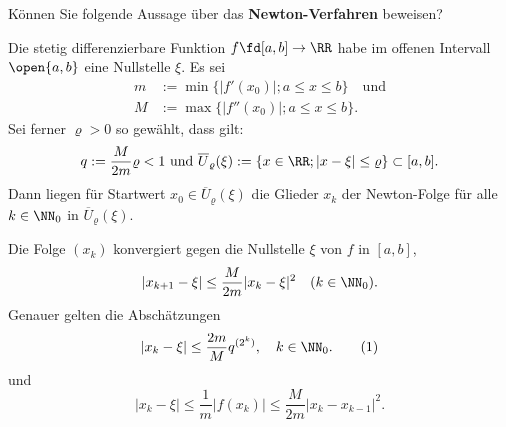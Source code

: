 \begin{frage}\label{q:newton-verfahren-beweis}
  Können Sie folgende Aussage über das \textbf{Newton-Verfahren} beweisen? 

  \medskip
  Die stetig differenzierbare Funktion $f\fd [a,b] \to \RR$ habe im 
  offenen Intervall $\open{a,b}$ eine Nullstelle $\xi$. Es sei 
  \begin{align*}
    m &:= \min\{ |f'(x_0)| ; a\le x \le b\} \quad\text{und} \\
    M &:= \max\{ |f''(x_0)| ; a\le x \le b\} .
  \end{align*}
  Sei ferner $\varrho>0$ so gewählt, dass gilt: 
  \[
  q:=\frac{M}{2m}\varrho<1 \text{ und }
  \overline{U}_{\varrho} (\xi) := \{ x\in\RR ;  |x-\xi| \le \varrho \} 
  \subset [a,b].
  \]
  Dann liegen für  Startwert $x_0\in \overline{U}_{\varrho} (\xi)$ die Glieder $x_k$ 
  der Newton-Folge für alle $k\in \NN_0$ in $\overline{U}_{\varrho} (\xi)$.

  \medskip
  \noindent
  Die Folge $(x_k)$ konvergiert  gegen die Nullstelle 
  $\xi$ von $f$ in $[a,b]$, \dasheisst 
  \[
  |x_{k+1}-\xi| \le \frac{M}{2m} | x_k-\xi |^2 \quad (k\in \NN_0).
  \]
  Genauer gelten die Abschätzungen
  \begin{equation}
  \left| x_k - \xi \right| \le \frac{2m}{M} q^{(2^k)}, \quad k\in\NN_0.\tag{1}
  \end{equation}
  und 
  \begin{equation}
  \left| x_k-\xi \right| \le \frac{1}{m} \left| f(x_k) \right| \le 
  \frac{M}{2m} \left| x_k-x_{k-1} \right|^2. 
  \tag{2}
\end{equation}
\end{frage}

